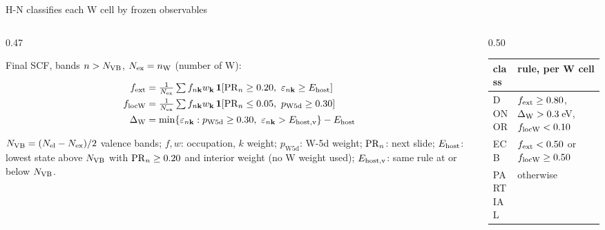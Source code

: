 \begin{frame}{H-N classifies each W cell by frozen observables}
  \elevenTop\elevendense
  \begin{columns}[T,onlytextwidth]
    \begin{column}{0.47\textwidth}
      {\footnotesize Final SCF, bands $n > N_{\mathrm{VB}}$, $N_{\mathrm{ex}} = n_{\mathrm{W}}$ (number of W):\par}
      \vspace{-1.6mm}
      {\footnotesize
      \begin{align*}
        f_{\mathrm{ext}} &= \tfrac{1}{N_{\mathrm{ex}}}\textstyle\sum f_{n\mathbf{k}}w_{\mathbf{k}}\,
          \mathbf{1}\!\left[\mathrm{PR}_n \ge 0.20,\ \varepsilon_{n\mathbf{k}} \ge E_{\mathrm{host}}\right]\\
        f_{\mathrm{locW}} &= \tfrac{1}{N_{\mathrm{ex}}}\textstyle\sum f_{n\mathbf{k}}w_{\mathbf{k}}\,
          \mathbf{1}\!\left[\mathrm{PR}_n \le 0.05,\ p_{\mathrm{W5d}} \ge 0.30\right]\\
        \Delta_{\mathrm{W}} &= \min\{\varepsilon_{n\mathbf{k}} : p_{\mathrm{W5d}} \ge 0.30,\ \varepsilon_{n\mathbf{k}} >
          E_{\mathrm{host,v}}\} - E_{\mathrm{host}}
      \end{align*}\par}
      \vspace{-0.3mm}
      {\scriptsize $N_{\mathrm{VB}} = (N_{\mathrm{el}} - N_{\mathrm{ex}})/2$ valence bands; $f, w$: occupation, $k$ weight;
        $p_{\mathrm{W5d}}$: W-5d weight; $\mathrm{PR}_n$: next slide; $E_{\mathrm{host}}$: lowest state above $N_{\mathrm{VB}}$ with
        $\mathrm{PR}_n \ge 0.20$ and interior weight (no W weight used); $E_{\mathrm{host,v}}$: same rule at or below $N_{\mathrm{VB}}$.\par}
    \end{column}
    \begin{column}{0.50\textwidth}
      \begingroup\scriptsize
      \renewcommand{\arraystretch}{1.12}
      \begin{tabularx}{\linewidth}{@{}l >{\raggedright\arraybackslash}X@{}}
        \toprule
        class & rule, per W cell \\
        \midrule
        DONOR & $f_{\mathrm{ext}} \ge 0.80$, $\Delta_{\mathrm{W}} > 0.3$\,eV, $f_{\mathrm{locW}} < 0.10$ \\
        ECB & $f_{\mathrm{ext}} < 0.50$ or $f_{\mathrm{locW}} \ge 0.50$ \\
        PARTIAL & otherwise \\

\end{tabularx}
\end{column}
\end{columns}
\end{frame}
